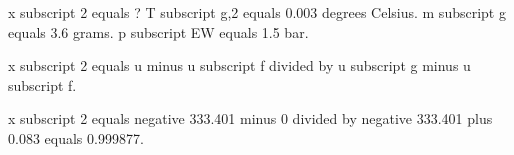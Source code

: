x subscript 2 equals ?  
T subscript g,2 equals 0.003 degrees Celsius.  
m subscript g equals 3.6 grams.  
p subscript EW equals 1.5 bar.  

x subscript 2 equals u minus u subscript f divided by u subscript g minus u subscript f.  

x subscript 2 equals negative 333.401 minus 0 divided by negative 333.401 plus 0.083 equals 0.999877.